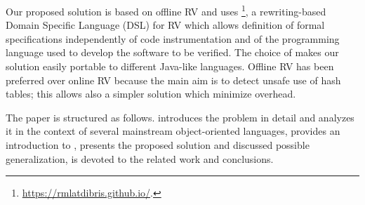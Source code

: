 Our proposed solution is based on offline RV and uses  \rml\footnote{\href{https://rmlatdibris.github.io/}{https://rmlatdibris.github.io/}.}, a rewriting-based Domain Specific Language (DSL) for RV
which allows definition of formal specifications independently of code instrumentation and of the programming language used
to develop the software to be verified. The choice of \rml makes our solution easily portable to different Java-like languages.
Offline RV has been preferred over online RV because the main aim is to detect unsafe use of hash tables; this allows also a simpler solution
which minimize overhead.

The paper is structured as follows.
 introduces the problem in detail and analyzes it in the context of several mainstream object-oriented languages,
 provides an introduction to \rml,  presents the proposed solution and discussed possible generalization,
 is devoted to the related work and conclusions.
